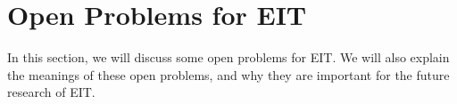 \documentclass[journal,twocolumn]{IEEEtran}
\begin{document}




\section{Open Problems for EIT}
In this section, we will discuss some open problems for EIT. We will also explain the meanings of these open problems, and why they are important for the future research of EIT. 
\end{document}
